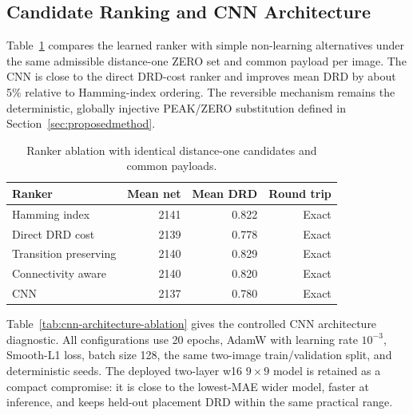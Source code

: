 \documentclass[a4paper,fleqn]{cas-dc}
\begin{document}
\subsection{Candidate Ranking and CNN Architecture}

Table~\ref{tab:ranker-ablation} compares the learned ranker with simple
non-learning alternatives under the same admissible distance-one ZERO set and
common payload per image. The CNN is close to the direct DRD-cost ranker and
improves mean DRD by about 5\% relative to Hamming-index ordering. The
reversible mechanism remains the deterministic, globally injective PEAK/ZERO
substitution defined in
Section~\ref{sec:proposedmethod}.

\begin{table}[t]
\centering
\caption{Ranker ablation with identical distance-one candidates and common
payloads.}
\label{tab:ranker-ablation}
\begin{tabular}{@{}lrrr@{}}
\toprule
\textbf{Ranker} & \textbf{Mean net} & \textbf{Mean DRD} &
\textbf{Round trip} \\
\midrule
Hamming index & 2141 & 0.822 & Exact \\
Direct DRD cost & 2139 & 0.778 & Exact \\
Transition preserving & 2140 & 0.829 & Exact \\
Connectivity aware & 2140 & 0.820 & Exact \\
CNN & 2137 & 0.780 & Exact \\
\bottomrule
\end{tabular}
\end{table}

Table~\ref{tab:cnn-architecture-ablation} gives the controlled CNN
architecture diagnostic. All configurations use 20 epochs, AdamW with learning
rate $10^{-3}$, Smooth-L1 loss, batch size 128, the same two-image
train/validation split, and deterministic seeds. The deployed two-layer
w16 $9\times9$ model is retained as a compact compromise: it is close to the
lowest-MAE wider model, faster at inference, and keeps held-out placement DRD
within the same practical range.
\end{document}
